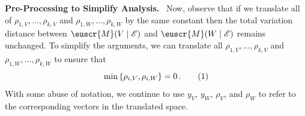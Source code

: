 \documentclass[11pt,letterpaper]{article}
\theoremstyle{plain}
\theoremstyle{definition}
\theoremstyle{remark}
\newcommand{\yesnum}{\addtocounter{equation}{1}\tag{\theequation}}
\newcommand{\inbrace}[1]{\ensuremath{\left\{#1\right\}}}
\newcommand{\evE}{\ensuremath{\mathscr{E}}}
\newcommand{\customcal}[1]{\euscr{#1}}
\newcommand{\cM}{\customcal{M}}
\renewcommand{\paragraph}[1]{\medskip \noindent\textbf{#1}~}
\begin{document}
{{    \paragraph{Pre-Processing to Simplify Analysis.}
    Now, observe that if we translate all of $\rho_{1,V},\dots,\rho_{k,V}$ and $\rho_{1,W},\dots,\rho_{k,W}$ by the same constant then the total variation distance between $\cM(V\mid \evE)$ and $\cM(W\mid \evE)$ remains unchanged.
    To simplify the arguments, we can translate all $\rho_{1,V},\dots,\rho_{k,V}$ and $\rho_{1,W},\dots,\rho_{k,W}$ to ensure that 
    \[
        \min\inbrace{\rho_{i,V}, \rho_{i,W}} = 0\,.
        \yesnum\label{eq:SS:translation}
    \]
    With some abuse of notation, we continue to use $y_V$, $y_W$, $\rho_V$, and $\rho_W$ to refer to the corresponding vectors in the translated space.
    
}}
\end{document}
